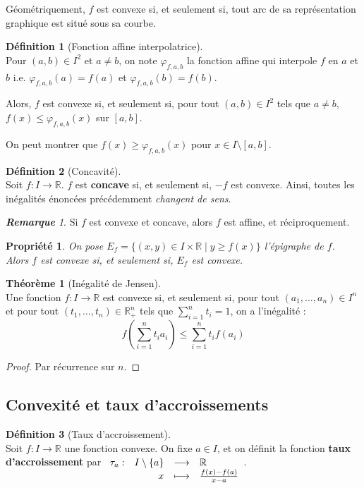 \documentclass[12pt]{book}
\let\ensembleNombre\mathbb
\newcommand*\R{\ensuremath{\ensembleNombre{R}}}
\newcommand{\app}[5]{\ensuremath{
\begin{array}[t]{lrcl}
#1 : & #2 & \longrightarrow & #3 \\
    & #4 & \longmapsto & #5 \end{array}
}}
\newtheorem*{prop}{Propriété}
\theoremstyle{definition}
\newtheorem*{defi}{Définition}
\newtheorem{thme}{Théorème}[chapter]
\theoremstyle{remark}
\newtheorem*{rem}{\textbf{Remarque}}
\newenvironment{fdef}
  {\begin{mdframed}[roundcorner=10pt, linewidth=1pt]\begin{defi}}
  {\end{defi}\end{mdframed}}
\newenvironment{fthme}
  {\begin{mdframed}[roundcorner=10pt, linewidth=2pt]\begin{thme}}
  {\end{thme}\end{mdframed}}
\begin{document}
	Géométriquement, $f$ est convexe si, et seulement si, tout arc de sa représentation graphique est situé sous sa courbe. \newpage
	
	\begin{fdef}[Fonction affine interpolatrice]\mbox{~}\\
	Pour $(a,b) \in I^2$ et $a \neq b$, on note $\varphi_{f,a,b}$ la fonction affine qui interpole $f$ en $a$ et $b$ i.e. $\varphi_{f,a,b} (a) = f(a)$ et $\varphi_{f,a,b} (b) = f(b)$.
	
	\noindent Alors, $f$ est convexe si, et seulement si, pour tout $(a,b) \in I^2$ tels que $a \neq b$, $f(x) \leq \varphi_{f,a,b} (x)$ sur $[a,b]$.
	\end{fdef}
	
	On peut montrer que $f(x) \geq \varphi_{f,a,b}(x)$ pour $x \in I \setminus [a,b]$.
	
	\begin{fdef}[Concavité]\mbox{~}\\
	Soit $f : I \longrightarrow \R$. $f$ est \textbf{concave} si, et seulement si, $-f$ est convexe. Ainsi, toutes les inégalités énoncées précédemment \textit{changent de sens}.
	\end{fdef}
	
	\begin{rem}
	Si $f$ est convexe et concave, alors $f$ est affine, et réciproquement.
	\end{rem}
	
	\begin{prop}
	On pose $E_f = \lbrace (x,y) \in I \times \R \;|\; y \geq f(x) \rbrace$ l'épigraphe de $f$. Alors $f$ est convexe si, et seulement si, $E_f$ est convexe.
	\end{prop}
	
	\begin{fthme}[Inégalité de Jensen]\mbox{~}\\
	Une fonction $f : I \longrightarrow \R$ est convexe si, et seulement si, pour tout $(a_1,\ldots, a_n) \in I^n$ et pour tout $(t_1,\ldots, t_n) \in \R_+^n$ tels que $\sum_{i=1}^n t_i = 1$, on a l'inégalité :
	\[\boxed{ f\left( \sum_{i=1}^n t_ia_i \right) \leq \sum_{i=1}^n t_if(a_i) }\]
	\end{fthme}
	
	\begin{proof}
	Par récurrence sur $n$.
	\end{proof}
	
	\subsection{Convexité et taux d'accroissements}
	\begin{fdef}[Taux d'accroissement]\mbox{~}\\
	Soit $f : I \longrightarrow \R$ une fonction convexe. On fixe $a \in I$, et on définit la fonction \textbf{taux d'accroissement} par $\app{\tau_a}{I \setminus \{a \}}{\R}{x}{\frac{f(x) - f(a)}{x - a}}$.
	\end{fdef}
	
\end{document}
